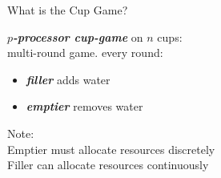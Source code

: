 \documentclass[xcolor=x11names, svgnames, rgb]{beamer}
\newcommand{\defn}[1]       {{\textit{\textbf{\boldmath #1}}}}
\begin{document}
\begin{frame}[t]{What is the Cup Game?}
  \begin{definition}
  \defn{$p$-processor cup-game} on $n$ cups: \\
  multi-round game. every round:
  \begin{itemize}
    \item \defn{filler} adds water
    \item \defn{emptier} removes water
  \end{itemize}
  \end{definition}

  \vspace{0.4cm}
  Note: \\
  Emptier must allocate resources discretely\\
  Filler can allocate resources continuously
\end{frame}
\end{document}
